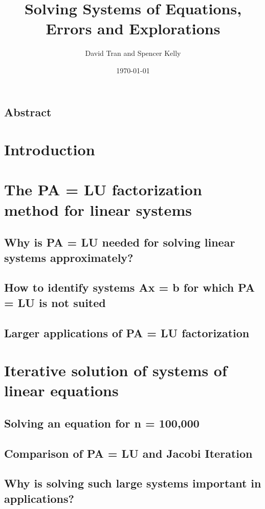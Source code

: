 \documentclass[11pt]{article}
\title{Solving Systems of Equations, Errors and Explorations}
\author{David Tran and Spencer Kelly}
\date{\today}
\begin{document}
\maketitle

\subsection*{Abstract}

\section{Introduction}

\section{The PA = LU factorization method for linear systems}

\subsection{Why is PA = LU needed for solving linear systems approximately?}

\subsection{How to identify systems Ax = b for which PA = LU is not suited}

\subsection{Larger applications of PA = LU factorization}

\section{Iterative solution of systems of linear equations}

\subsection{Solving an equation for n = 100,000}

\subsection{Comparison of PA = LU and Jacobi Iteration}

\subsection{Why is solving such large systems important in applications?}
\end{document}
